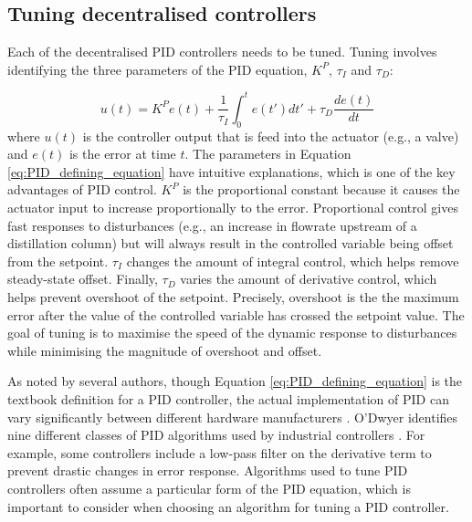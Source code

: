 
\subsection{Tuning decentralised controllers}
Each of the decentralised PID controllers needs to be tuned. Tuning involves identifying the three parameters of the PID equation, $K^P$, $\tau_I$ and $\tau_D$:

\begin{equation}
    \label{eq:PID_defining_equation}
    u(t) = K^P e(t) + \frac{1}{\tau_I}\int_0^t e(t')dt' + \tau_D \frac{de(t)}{dt}
\end{equation}
where $u(t)$ is the controller output that is feed into the actuator (e.g., a valve) and $e(t)$ is the error at time $t$.
The parameters in Equation \ref{eq:PID_defining_equation} have intuitive explanations, which is one of the key advantages of PID control. $K^P$ is the proportional constant because it causes the actuator input to increase proportionally to the error. Proportional control gives fast responses to disturbances (e.g., an increase in flowrate upstream of a distillation column) but will always result in the controlled variable being offset from the setpoint. $\tau_I$ changes the amount of integral control, which helps remove steady-state offset.  Finally, $\tau_D$ varies the amount of derivative control, which helps prevent overshoot of the setpoint. Precisely, overshoot is the the maximum error after the value of the controlled variable has crossed the setpoint value. The goal of tuning is to maximise the speed of the dynamic response to disturbances while minimising the magnitude of overshoot and offset. 
    
As noted by several authors, though Equation \ref{eq:PID_defining_equation} is the textbook definition for a PID controller, the actual implementation of PID can vary significantly between different hardware manufacturers \cite{ODwyer2009, KiamHeongAng2005}.  O'Dwyer identifies nine different classes of PID algorithms used by industrial controllers \cite{ODwyer2009}. For example, some controllers include a low-pass filter on the derivative term to prevent drastic changes in error response. Algorithms used to tune PID controllers often assume a particular form of the PID equation, which is important to consider when choosing an algorithm for tuning a PID controller.  

